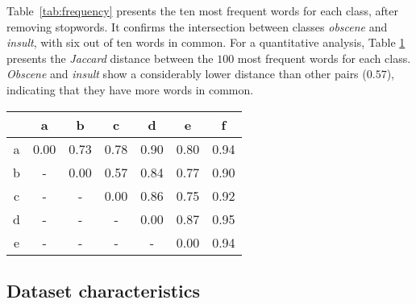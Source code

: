 \documentclass[11pt,a4paper]{article}
\begin{document}
Table~\ref{tab:frequency} presents the ten most frequent words for each class, after removing stopwords. It confirms the intersection between classes \textit{obscene} and \textit{insult}, with six out of ten words in common. For a quantitative analysis, Table \ref{jaccard} presents the \textit{Jaccard} distance between the $100$ most frequent words for each class. \textit{Obscene} and \textit{insult} show a considerably lower distance than other pairs ($0.57$), indicating that they have more words in common.

\begin{table}
\centering
\begin{tabular}{@{}ccccccc@{}}
\toprule
                       & a    & b    & c    & d    & e    & f    \\ \midrule
\multicolumn{1}{c|}{a} & 0.00 & 0.73 & 0.78 & 0.90 & 0.80 & 0.94 \\
\multicolumn{1}{c|}{b} & - & 0.00 & 0.57 & 0.84 & 0.77 & 0.90 \\
\multicolumn{1}{c|}{c} & - & - & 0.00 & 0.86 & 0.75 & 0.92 \\
\multicolumn{1}{c|}{d} & - & - & - & 0.00 & 0.87 & 0.95 \\
\multicolumn{1}{c|}{e} & - & - & - & - & 0.00 & 0.94 \\
\bottomrule
\end{tabular}
 \label{jaccard}
\end{table}



\subsection{Dataset characteristics}
\end{document}
